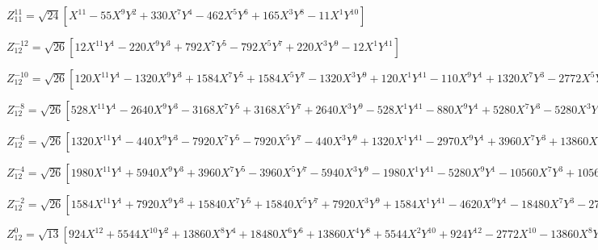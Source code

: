 \documentclass[10pt,landscape]{article}
\begin{document}
\vspace{1.2 mm}
\noindent $ Z^{11}_{11} = \sqrt{24} [X^{11} -55X^{9}Y^{2} +330X^{7}Y^{4} -462X^{5}Y^{6} +165X^{3}Y^{8} -11X^{1}Y^{10}] $

\vspace{1.2 mm}
\noindent $ Z^{-12}_{12} = \sqrt{26} [12X^{11}Y^{1} -220X^{9}Y^{3} +792X^{7}Y^{5} -792X^{5}Y^{7} +220X^{3}Y^{9} -12X^{1}Y^{11}] $

\vspace{1.2 mm}
\noindent $ Z^{-10}_{12} = \sqrt{26} [120X^{11}Y^{1} -1320X^{9}Y^{3} +1584X^{7}Y^{5} +1584X^{5}Y^{7} -1320X^{3}Y^{9} +120X^{1}Y^{11} -110X^{9}Y^{1} +1320X^{7}Y^{3} -2772X^{5}Y^{5} +1320X^{3}Y^{7} -110X^{1}Y^{9}] $

\vspace{1.2 mm}
\noindent $ Z^{-8}_{12} = \sqrt{26} [528X^{11}Y^{1} -2640X^{9}Y^{3} -3168X^{7}Y^{5} +3168X^{5}Y^{7} +2640X^{3}Y^{9} -528X^{1}Y^{11} -880X^{9}Y^{1} +5280X^{7}Y^{3} -5280X^{3}Y^{7} +880X^{1}Y^{9} +360X^{7}Y^{1} -2520X^{5}Y^{3} +2520X^{3}Y^{5} -360X^{1}Y^{7}] $

\vspace{1.2 mm}
\noindent $ Z^{-6}_{12} = \sqrt{26} [1320X^{11}Y^{1} -440X^{9}Y^{3} -7920X^{7}Y^{5} -7920X^{5}Y^{7} -440X^{3}Y^{9} +1320X^{1}Y^{11} -2970X^{9}Y^{1} +3960X^{7}Y^{3} +13860X^{5}Y^{5} +3960X^{3}Y^{7} -2970X^{1}Y^{9} +2160X^{7}Y^{1} -5040X^{5}Y^{3} -5040X^{3}Y^{5} +2160X^{1}Y^{7} -504X^{5}Y^{1} +1680X^{3}Y^{3} -504X^{1}Y^{5}] $

\vspace{1.2 mm}
\noindent $ Z^{-4}_{12} = \sqrt{26} [1980X^{11}Y^{1} +5940X^{9}Y^{3} +3960X^{7}Y^{5} -3960X^{5}Y^{7} -5940X^{3}Y^{9} -1980X^{1}Y^{11} -5280X^{9}Y^{1} -10560X^{7}Y^{3} +10560X^{3}Y^{7} +5280X^{1}Y^{9} +5040X^{7}Y^{1} +5040X^{5}Y^{3} -5040X^{3}Y^{5} -5040X^{1}Y^{7} -2016X^{5}Y^{1} +2016X^{1}Y^{5} +280X^{3}Y^{1} -280X^{1}Y^{3}] $

\vspace{1.2 mm}
\noindent $ Z^{-2}_{12} = \sqrt{26} [1584X^{11}Y^{1} +7920X^{9}Y^{3} +15840X^{7}Y^{5} +15840X^{5}Y^{7} +7920X^{3}Y^{9} +1584X^{1}Y^{11} -4620X^{9}Y^{1} -18480X^{7}Y^{3} -27720X^{5}Y^{5} -18480X^{3}Y^{7} -4620X^{1}Y^{9} +5040X^{7}Y^{1} +15120X^{5}Y^{3} +15120X^{3}Y^{5} +5040X^{1}Y^{7} -2520X^{5}Y^{1} -5040X^{3}Y^{3} -2520X^{1}Y^{5} +560X^{3}Y^{1} +560X^{1}Y^{3} -42X^{1}Y^{1}] $

\vspace{1.2 mm}
\noindent $ Z^{0}_{12} = \sqrt{13} [924X^{12} +5544X^{10}Y^{2} +13860X^{8}Y^{4} +18480X^{6}Y^{6} +13860X^{4}Y^{8} +5544X^{2}Y^{10} +924Y^{12} -2772X^{10} -13860X^{8}Y^{2} -27720X^{6}Y^{4} -27720X^{4}Y^{6} -13860X^{2}Y^{8} -2772Y^{10} +3150X^{8} +12600X^{6}Y^{2} +18900X^{4}Y^{4} +12600X^{2}Y^{6} +3150Y^{8} -1680X^{6} -5040X^{4}Y^{2} -5040X^{2}Y^{4} -1680Y^{6} +420X^{4} +840X^{2}Y^{2} +420Y^{4} -42X^{2} -42Y^{2} +1] $
\end{document}
